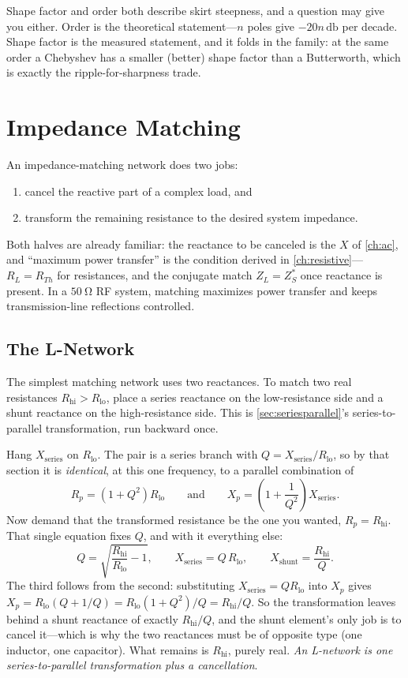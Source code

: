 \begin{exambox}
Shape factor and order both describe skirt steepness, and a question may give you
either. Order is the theoretical statement---\(n\) poles give
\(-20n\,\si{\decibel}\) per decade. Shape factor is the measured statement, and it
folds in the family: at the same order a Chebyshev has a smaller (better) shape
factor than a Butterworth, which is exactly the ripple-for-sharpness trade.
\end{exambox}

\section{Impedance Matching}
An impedance-matching network does two jobs:
\begin{enumerate}
\item cancel the reactive part of a complex load, and
\item transform the remaining resistance to the desired system impedance.
\end{enumerate}
Both halves are already familiar: the reactance to be canceled is the \(X\) of
\cref{ch:ac}, and ``maximum power transfer'' is the condition derived in
\cref{ch:resistive}---\(R_L=R_{Th}\) for resistances, and the conjugate match
\(Z_L=Z_S^{*}\) once reactance is present. In a \(\SI{50}{\ohm}\) RF system, matching
maximizes power transfer and keeps transmission-line reflections controlled.

\subsection{The L-Network}
\label{sec:lnetwork}
The simplest matching network uses two reactances. To match two real resistances
\(R_{\text{hi}}>R_{\text{lo}}\), place a series reactance on the low-resistance
side and a shunt reactance on the high-resistance side. This is
\cref{sec:seriesparallel}'s series-to-parallel transformation, run backward once.

Hang \(X_{\text{series}}\) on \(R_{\text{lo}}\). The pair is a series branch with
\(Q=X_{\text{series}}/R_{\text{lo}}\), so by that section it is \emph{identical}, at
this one frequency, to a parallel combination of
\[
R_p=\left(1+Q^2\right)R_{\text{lo}}
\qquad\text{and}\qquad
X_p=\left(1+\frac{1}{Q^2}\right)X_{\text{series}} .
\]
Now demand that the transformed resistance be the one you wanted,
\(R_p=R_{\text{hi}}\). That single equation fixes \(Q\), and with it everything else:
\[
Q=\sqrt{\frac{R_{\text{hi}}}{R_{\text{lo}}}-1},
\qquad
X_{\text{series}}=Q\,R_{\text{lo}},
\qquad
X_{\text{shunt}}=\frac{R_{\text{hi}}}{Q}.
\]
The third follows from the second: substituting \(X_{\text{series}}=QR_{\text{lo}}\)
into \(X_p\) gives
\(X_p=R_{\text{lo}}(Q+1/Q)=R_{\text{lo}}(1+Q^2)/Q=R_{\text{hi}}/Q\). So the
transformation leaves behind a shunt reactance of exactly \(R_{\text{hi}}/Q\), and
the shunt element's only job is to cancel it---which is why the two reactances must
be of opposite type (one inductor, one capacitor). What remains is \(R_{\text{hi}}\),
purely real. \emph{An L-network is one series-to-parallel transformation plus a
cancellation}.

